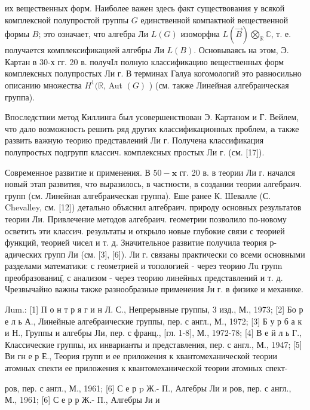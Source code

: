 \documentclass[10pt]{article}
\begin{document}
их вещественных форм. Наиболее важен здесь факт существования у всякой комплексной полупростой группы $G$ единственной компактной вещественной формы $B$; это означает, что алгебра Ли $L(G)$ изоморфна $L(\vec{B}) \bigotimes_{\mathbb{R}} \mathbb{C}$, т. е. получается комплексификацией алгебры Ли $L(B)$. Основываясь на этом, Э. Картан в 30-х гг. 20 в. получІл полную классификацию вещественных форм комплексных полупростых Ли г. В терминах Галуа когомологий это равносильно описанию множества $H^{1}(\mathbb{R}$, Aut $(G)$ ) (см. также Линейная алгебраическая группа).



Впоследствии метод Киллинга был усовершенствован Э. Картаном и Г. Вейлем, что дало возможность решить ряд других классификационных проблем, $\mathbf{a}$ также развить важную теорию представлений Ли $г$. Получена классификация полупростых подгрупп классич. комплексных простых Ли г. (см. [17]).



Современное развитие и применения. В $50-\mathbf{x}$ гг. 20 в. в теории Ли г. начался новый этап развития, что выразилось, в частности, в создании теории алгебраич. групп (см. Линейная алгебраическая группа). Еше ранее К. Шевалле (С. Chevalley, см. [12]) детально объяснил алгебраич. природу основных результатов теории Ли. Привлечение методов алгебраич. геометрии позволило по-новому осветить эти классич. результаты и открыло новые глубокие связи с теорией функций, теорией чисел и т. д. Значительное развитие получила теория р-адических групп Ли (см. [3], [6]). Ли г. связаны практически со всеми основными разделами математики: с геометрией и топологией - через теорию Лu групn преобразованиц̆, с анализом - через теорию линейных представлений и т. д. Чрезвычайно важны также разнообразные применения Ји г. в физике и механике.



Лum.: [1] П о н т р я г и н Л. С., Непрерывные группы, 3 изд., М., 1973; [2] Бо р е л ь А., Линейные алгебраические группы, пер. с англ., М., 1972; [3] Б у р б а к и Н., Группы и алгебры ЈІи, пер. с франц., [гл. 1-8], М., 1972-78; [4] В е й л ь Г., Классические группы, их инварианты и представления, пер. с англ., М., 1947; [5] Ви гн е р Е., Теория групп и ее приложения к квантомеханической теории атомных спекти ее приложения к квантомеханической теории атомных спект-

ров, пер. с англ., М., 1961; [6] С е р p Ж.- П., Алгебры Ли и ров, пер. с англ., М., 1961; [6] С е р р Ж.- П., Алгебры Ји и
\end{document}
